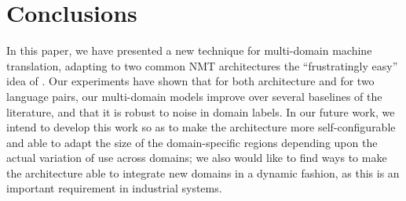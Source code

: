 \documentclass[11pt,a4paper]{article}
\newcommand{\fyTodo}[1]{\Todo[FY:]{\textcolor{orange}{#1}}}
\begin{document}


\section{Conclusions}
In this paper, we have presented a new technique for multi-domain machine translation, adapting to two common NMT architectures the ``frustratingly easy'' idea of \cite{Daume07frustratingly}. Our experiments have shown that for both architecture and for two language pairs, our multi-domain models improve over several baselines of the literature, and that it is robust to noise in domain labels. In our future work, we intend to develop this work so as to make the architecture more self-configurable and able to adapt the size of the domain-specific regions depending upon the actual variation of use across domains; we also would like to find ways to make the architecture able to integrate new domains in a dynamic fashion, as this is an important requirement in industrial systems.




\end{document}
